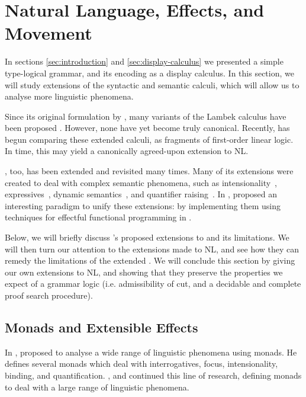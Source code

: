 \documentclass[a4paper]{article}
\begin{document}





\section{Natural Language, Effects, and Movement}

In sections \autoref{sec:introduction} and
\autoref{sec:display-calculus} we presented a simple type-logical
grammar, and its encoding as a display calculus. In this section, we
will study extensions of the syntactic and semantic calculi, which
will allow us to analyse more linguistic phenomena.

Since its original formulation by \citet{lambek1961}, many variants of
the Lambek calculus have been proposed
\citep{steedman1988,moortgat2012,morrill2011,kubota2012,barker2015}.
However, none have yet become truly canonical.
Recently, \citet{moot2015} has begun comparing these extended calculi,
as fragments of first-order linear logic. In time, this may yield a
canonically agreed-upon extension to NL.

\lamET, too, has been extended and revisited many times. Many of its
extensions were created to deal with complex semantic phenomena, such
as intensionality~\citep{winter2009},
expressives~\citep{potts2003,mccready2010,gutzmann2011}, dynamic
semantics~\citep{groenendijk1995}, and quantifier
raising~\citep{barker2015}. 
In \citeyear{shan2002}, \citeauthor{shan2002} proposed an interesting
paradigm to unify these extensions: by implementing them using
techniques for effectful functional programming in \lamET.

Below, we will briefly discuss \citeauthor{shan2002}'s proposed
extensions to \lamET and its limitations. We will then turn our
attention to the extensions made to NL, and see how they can remedy
the limitations of the extended \lamET. We will conclude this section
by giving our own extensions to NL, and showing that they preserve the
properties we expect of a grammar logic (i.e. admissibility of cut,
and a decidable and complete proof search procedure).

\subsection{Monads and Extensible Effects}
In \citeyear{shan2002}, \citeauthor{shan2002} proposed to analyse a
wide range of linguistic phenomena using monads. He defines several
monads which deal with interrogatives, focus, intensionality, binding,
and quantification. \citet{bumford2013}, \citet{charlow2014} and
\citet{barker2015} continued this line of research, defining monads to
deal with a large range of linguistic phenomena.
\end{document}
